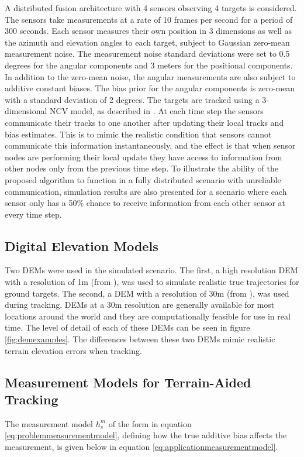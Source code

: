 \documentclass[journal]{IEEEtran}
\begin{document}
A distributed fusion architecture with 4 sensors observing 4 targets is considered. The sensors take measurements at a rate of 10 frames per second for a period of 300 seconds. Each sensor measures their own position in 3 dimensions as well as the azimuth and elevation angles to each target, subject to Gaussian zero-mean measurement noise. The measurement noise standard deviations were set to 0.5 degrees for the angular components and 3 meters for the positional components. In addition to the zero-mean noise, the angular measurements are also subject to additive constant biases. The bias prior for the angular components is zero-mean with a standard deviation of 2 degrees. The targets are tracked using a 3-dimensional NCV model, as described in \cite{bar2004estimation}. At each time step the sensors communicate their tracks to one another after updating their local tracks and bias estimates. This is to mimic the realistic condition that sensors cannot communicate this information instantaneously, and the effect is that when sensor nodes are performing their local update they have access to information from other nodes only from the previous time step. To illustrate the ability of the proposed algorithm to function in a fully distributed scenario with unreliable communication, simulation results are also presented for a scenario where each sensor only has a 50\% chance to receive information from each other sensor at every time step.

\subsection{Digital Elevation Models} \label{applicationdems}
Two DEMs were used in the simulated scenario. The first, a high resolution DEM with a resolution of 1m (from \cite{robinson2012high}), was used to simulate realistic true trajectories for ground targets. The second, a DEM with a resolution of 30m (from \cite{jpl13}), was used during tracking. DEMs at a 30m resolution are generally available for most locations around the world \cite{jpl13} and they are computationally feasible for use in real time. The level of detail of each of these DEMs can be seen in figure \ref{fig:demexamples}. The differences between these two DEMs mimic realistic terrain elevation errors when tracking.

\subsection{Measurement Models for Terrain-Aided Tracking} \label{applicationmeasurementmodels}
The measurement model $h_{s}^{m}$ of the form in equation \ref{eq:problemmeasurementmodel}, defining how the true additive bias affects the measurement, is given below in equation \ref{eq:applicationmeasurementmodel}.
\end{document}
